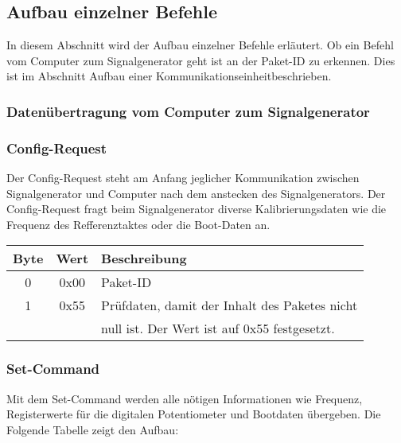 \subsection{Aufbau einzelner Befehle}
In diesem Abschnitt wird der Aufbau einzelner Befehle erläutert. Ob ein Befehl vom Computer zum Signalgenerator geht ist an der Paket-ID zu erkennen. Dies ist im Abschnitt \glqq Aufbau einer Kommunikationseinheit\grqq beschrieben.

\pagebreak
\subsubsection[Computer $\rightarrow$ Signalgenerator]{Datenübertragung vom Computer zum Signalgenerator}

\subsubsection*{Config-Request}
Der Config-Request steht am Anfang jeglicher Kommunikation zwischen Signalgenerator und Computer nach dem anstecken des Signalgenerators. Der Config-Request fragt beim Signalgenerator diverse Kalibrierungsdaten wie die Frequenz des Refferenztaktes oder die Boot-Daten an.

\begin{flushleft}
\begin{tabular}{c||c|l}
Byte & Wert & Beschreibung \\
\hline
\hline
0 & 0x00 & Paket-ID \\
\hline
1 & 0x55 & Prüfdaten, damit der Inhalt des Paketes nicht \\
& & null ist. Der Wert ist auf 0x55 festgesetzt.\\
\end{tabular}
\end{flushleft}

\subsubsection*{Set-Command}
Mit dem Set-Command werden alle nötigen Informationen wie Frequenz, Registerwerte für die digitalen Potentiometer und Bootdaten übergeben. Die Folgende Tabelle zeigt den Aufbau:
\linebreak


